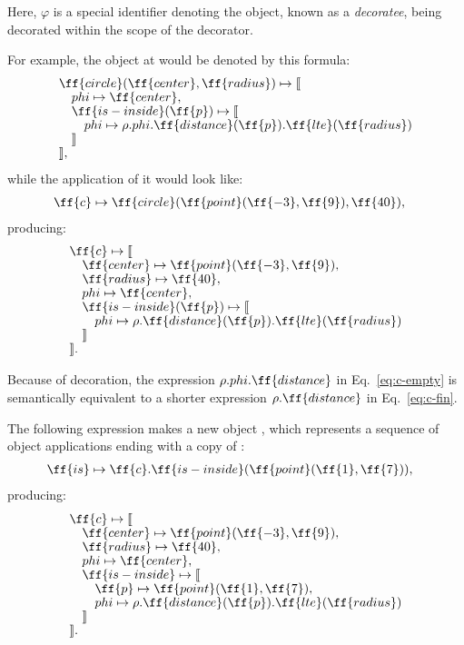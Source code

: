 Here, \(\varphi\) is a special identifier denoting the object,
known as a \emph{decoratee}, being decorated
within the scope of the decorator.

For example, the object at  would
be denoted by this formula:
\begin{equation}\label{eq:c-empty}
\begin{split}
& \ff{circle}(\ff{center}, \ff{radius}) \mapsto \llbracket \br
& \quad \varphi \mapsto \ff{center}, \br
& \quad \ff{is-inside}(\ff{p}) \mapsto \llbracket \br
& \quad \quad \varphi \mapsto \rho.\varphi.\ff{distance}(\ff{p}).\ff{lte}(\ff{radius}) \br
& \quad \rrbracket \br
& \rrbracket,
\end{split}
\end{equation}
while the application of it would look like:
\begin{equation}
\begin{split}
\ff{c} & \mapsto \ff{circle}(\ff{point}(\ff{-3}, \ff{9}), \ff{40}),
\end{split}
\end{equation}
producing:
\begin{equation}\label{eq:c-fin}
\begin{split}
& \ff{c} \mapsto \llbracket \br
& \quad \ff{center} \mapsto \ff{point}(\ff{-3}, \ff{9}), \br
& \quad \ff{radius} \mapsto \ff{40}, \br
& \quad \varphi \mapsto \ff{center}, \br
& \quad \ff{is-inside}(\ff{p}) \mapsto \llbracket \br
& \quad \quad \varphi \mapsto \rho.\ff{distance}(\ff{p}).\ff{lte}(\ff{radius}) \br
& \quad \rrbracket \br
& \rrbracket.
\end{split}
\end{equation}

Because of decoration, the expression
\(\rho.\varphi.\ff{distance}\) in Eq.~\ref{eq:c-empty} is semantically equivalent to a shorter expression
\(\rho.\ff{distance}\) in Eq.~\ref{eq:c-fin}.

The following expression makes a new object , which represents
a sequence of object applications ending with a copy of :
\begin{equation}\label{eq:is}
\begin{split}
& \ff{is} \mapsto \ff{c}.\ff{is-inside}(\ff{point}(\ff{1}, \ff{7})),
\end{split}
\end{equation}
producing:
\begin{equation}\label{eq:c-fin2}
\begin{split}
& \ff{c} \mapsto \llbracket \br
& \quad \ff{center} \mapsto \ff{point}(\ff{-3}, \ff{9}), \br
& \quad \ff{radius} \mapsto \ff{40}, \br
& \quad \varphi \mapsto \ff{center}, \br
& \quad \ff{is-inside} \mapsto \llbracket \br
& \quad \quad \ff{p} \mapsto \ff{point}(\ff{1}, \ff{7}), \br
& \quad \quad \varphi \mapsto \rho.\ff{distance}(\ff{p}).\ff{lte}(\ff{radius}) \br
& \quad \rrbracket \br
& \rrbracket.
\end{split}
\end{equation}

